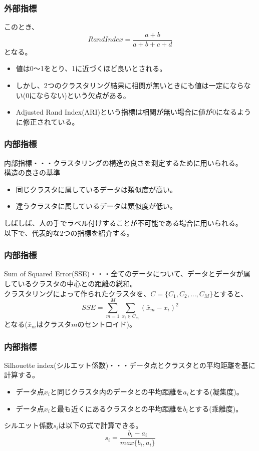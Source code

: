 \documentclass[dvipdfmx,11pt,notheorems]{beamer}
\theoremstyle{definition}
\begin{document}
\begin{frame}\frametitle{外部指標}
このとき、
\begin{displaymath}
Rand Index = \frac{a+b}{a+b+c+d}
\end{displaymath}
となる。
\begin{itemize}
\item 値は0～1をとり、1に近づくほど良いとされる。
\item しかし、2つのクラスタリング結果に相関が無いときにも値は一定にならない(0にならない)という欠点がある。
\item Adjusted Rand Index(ARI)という指標は相関が無い場合に値が0になるように修正されている。
\end{itemize}
\end{frame}



\begin{frame}\frametitle{内部指標}
内部指標・・・クラスタリングの構造の良さを測定するために用いられる。\\
構造の良さの基準
\begin{itemize}
\item 同じクラスタに属しているデータは類似度が高い。
\item 違うクラスタに属しているデータは類似度が低い。
\end{itemize}
しばしば、人の手でラベル付けすることが不可能である場合に用いられる。\\
以下で、代表的な2つの指標を紹介する。

\end{frame}



\begin{frame}\frametitle{内部指標}
Sum of Squared Error(SSE)・・・全てのデータについて、データとデータが属しているクラスタの中心との距離の総和。\\
クラスタリングによって作られたクラスタを、$C=\{C_1,C_2,...,C_M\}$とすると、
\begin{displaymath}
SSE = \sum_{m=1}^{M} \sum_{x_i \in C_m} (\bar{x}_m - x_i)^2
\end{displaymath}
となる($\bar{x}_m$はクラスタ$m$のセントロイド)。\\
\end{frame}


\begin{frame}\frametitle{内部指標}
Silhouette index(シルエット係数)・・・データ点とクラスタとの平均距離を基に計算する。\\
\begin{itemize}
\item データ点$x_i$と同じクラスタ内のデータとの平均距離を$a_i$とする(凝集度)。\\
\item データ点$x_i$と最も近くにあるクラスタとの平均距離を$b_i$とする(乖離度)。\\
\end{itemize}
シルエット係数$s_i$は以下の式で計算できる。
\begin{displaymath}
s_i = \frac{b_i-a_i}{max\{b_i,a_i\}}
\end{displaymath}
\end{frame}
\end{document}
